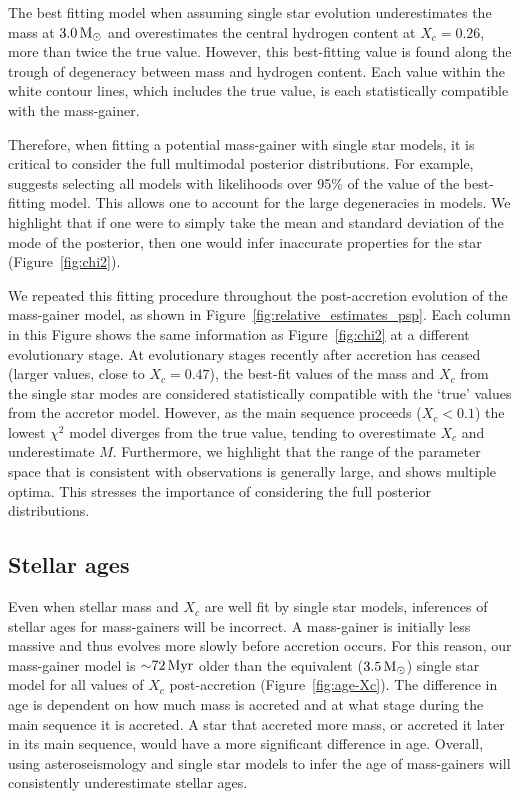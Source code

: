 \documentclass[desactivate]{aa}
\begin{document}
The best fitting model when assuming single star evolution underestimates the mass at $3.0 \,{\rm M_\odot}$ and overestimates the central hydrogen content at $X_c = 0.26$, more than twice the true value. However, this best-fitting value is found along the trough of degeneracy between mass and hydrogen content. Each value within the white contour lines, which includes the true value, is each statistically compatible with the mass-gainer.

Therefore, when fitting a potential mass-gainer with single star models, it is critical to consider the full multimodal posterior distributions. For example, \citealt{Basu+2012:2012ApJ...746...76B} suggests selecting all models with likelihoods over
95\% of the value of the best-fitting model. This allows one to account for the large degeneracies in models. We highlight that if one were to simply take the mean and standard deviation of the mode of the posterior, then one would infer inaccurate properties for the star (Figure~\ref{fig:chi2}).

We repeated this fitting procedure throughout the post-accretion evolution of the mass-gainer model, as shown in Figure~\ref{fig:relative_estimates_psp}. Each column in this Figure shows the same information as Figure~\ref{fig:chi2} at a different evolutionary stage. At evolutionary stages recently after accretion has ceased (larger values, close to $X_c = 0.47$), the best-fit values of the mass and $X_c$ from the single star modes are considered statistically compatible with the `true' values from the accretor model. However, as the main sequence proceeds ($X_c < 0.1$) the lowest $\chi^2$ model diverges from the true value, tending to overestimate $X_c$ and underestimate $M$. Furthermore, we highlight that the range of the parameter space that is consistent with observations is generally large, and shows multiple optima. This stresses the importance of considering the full posterior distributions.

\subsection{Stellar ages}

Even when stellar mass and $X_c$ are well fit by single star models, inferences of stellar ages for mass-gainers will be incorrect. A mass-gainer is initially less massive and thus evolves more slowly before accretion occurs. For this reason, our mass-gainer model is ${\sim}72 \, {\rm Myr}$ older than the equivalent ($3.5 \, {\rm M_\odot}$) single star model for all values of $X_c$ post-accretion (Figure~\ref{fig:age-Xc}). The difference in age is dependent on how much mass is accreted and at what stage during the main sequence it is accreted. A star that accreted more mass, or accreted it later in its main sequence, would have a more significant difference in age. Overall, using asteroseismology and single star models to infer the age of mass-gainers will consistently underestimate stellar ages.
\end{document}
